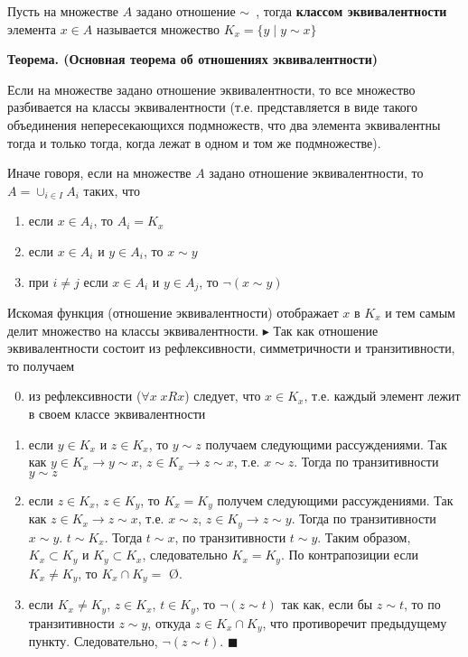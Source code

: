 Пусть на множестве $A$ задано отношение $\sim$ \,, тогда \textbf{классом эквивалентности} элемента $x \in A$ называется множество $K_x = \{y \; | \; y\sim x\}$
\\ \par \textbf{Теорема. (Основная теорема об отношениях эквивалентности) } \par Если на множестве задано отношение эквивалентности, то все множество разбивается на классы эквивалентности (т.е. представляется в виде такого объединения непересекающихся подмножеств, что два элемента эквивалентны тогда и только тогда, когда лежат в одном и том же подмножестве).
\par Иначе говоря, если на множестве $A$ задано отношение эквивалентности, то $A = \cup_{i \in I}A_i$ таких, что 
\begin{enumerate}
    \item если $x \in A_i$, то $A_i = K_x$
    \item если $x \in A_i$ и $y \in A_i$, то $x \sim y$
    \item при $i \neq j$ если $x \in A_i$ и $y \in A_j$, то $\neg(x \sim y)$
\end{enumerate}
Искомая функция (отношение эквивалентности) отображает $x$ в $K_x$ и тем самым делит множество на классы эквивалентности.
\newline $\blacktriangleright$
Так как отношение эквивалентности состоит из рефлексивности, симметричности и транзитивности, то получаем
\begin{enumerate}
\setcounter{enumi}{-1}
    \item из рефлексивности ($\forall x \; xRx$) следует, что $x \in K_x$, т.е. каждый элемент лежит в своем классе эквивалентности
    \item если $y \in K_x$ и $z \in K_x$, то $y \sim z$ получаем следующими рассуждениями. Так как $y \in K_x \rightarrow y \sim x$, $z \in K_x \rightarrow z \sim x$, т.е. $x \sim z$. Тогда по транзитивности $y \sim z$
    \item если $z \in K_x$, $z \in K_y$, то $ K_x = K_y$ получем следующими рассуждениями. Так как $z \in K_x \rightarrow z \sim x$, т.е. $x \sim z$, $z \in K_y \rightarrow z \sim y$. Тогда по транзитивности $x \sim y$.  $t \sim K_x$. Тогда $t \sim x$, по транзитивности $t \sim y$. Таким образом, $K_x \subset K_y$ и $K_y \subset K_x$, следовательно $K_x=K_y$. По контрапозиции если $K_x \neq K_y$, то $K_x \cap K_y = $ \O.
    \item если $K_x \neq K_y$, $z \in K_x$, $t \in K_y$, то $\neg(z \sim t)$ так как, если бы $z \sim t$, то по транзитивности $z \sim y$, откуда $z \in K_x \cap K_y$, что противоречит предыдущему пункту. Следовательно, $\neg(z \sim t)$. $\blacksquare$
\end{enumerate}

